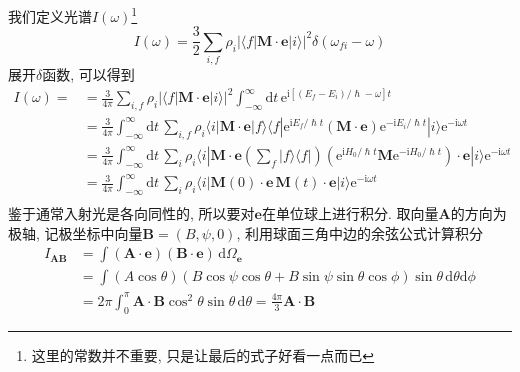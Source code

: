     我们定义光谱$I(\omega)$\footnote{这里的常数并不重要, 只是让最后的式子好看一点而已}
    \begin{equation}\label{eq:5-1}
        I(\omega) = \frac{3}{2} \sum_{i,f} \rho_i \left| \langle f|\bm{M} \cdot \bm{e}|i \rangle \right|^2 \delta(\omega_{fi} - \omega)
    \end{equation}
    展开$\delta$函数, 可以得到
    \begin{equation}\begin{aligned}
        I(\omega) = 
        &= \frac{3}{4\pi} \sum_{i,f} \rho_i \left| \langle f|\bm{M} \cdot \bm{e}|i \rangle \right|^2 \int_{-\infty}^{\infty} \mathrm{d}t\, \mathrm{e}^{\mathrm{i}\left[(E_f - E_i)/\hslash - \omega\right]t} \\
        &= \frac{3}{4\pi} \int_{-\infty}^{\infty} \mathrm{d}t\, \sum_{i,f} \rho_i \langle i|\bm{M} \cdot \bm{e}|f \rangle \langle f| \mathrm{e}^{\mathrm{i}E_f/\hslash t} \left(\bm{M} \cdot \bm{e}\right) \mathrm{e}^{-\mathrm{i}E_i/\hslash t} |i \rangle \mathrm{e}^{-\mathrm{i} \omega t} \\
        &= \frac{3}{4\pi} \int_{-\infty}^{\infty} \mathrm{d}t\, \sum_{i} \rho_i \langle i|\bm{M} \cdot \bm{e} \left(\sum_{f} |f \rangle \langle f| \right) \left( \mathrm{e}^{\mathrm{i}H_0/\hslash t} \bm{M} \mathrm{e}^{-\mathrm{i}H_0/\hslash t} \right) \cdot \bm{e}  |i \rangle \mathrm{e}^{-\mathrm{i} \omega t} \\
        &= \frac{3}{4\pi} \int_{-\infty}^{\infty} \mathrm{d}t\, \sum_{i} \rho_i \langle i|\bm{M}(0) \cdot \bm{e} \, \bm{M}(t) \cdot \bm{e} |i \rangle \mathrm{e}^{-\mathrm{i} \omega t} \\
    \end{aligned}\end{equation}
    鉴于通常入射光是各向同性的, 所以要对$\bm{e}$在单位球上进行积分. 取向量$\bm{A}$的方向为极轴, 记极坐标中向量$\bm{B} = (B, \psi, 0)$, 利用球面三角中边的余弦公式计算积分
    \begin{equation}\begin{aligned}
        I_{\bm{AB}} 
        &= \int (\bm{A} \cdot \bm{e})(\bm{B} \cdot \bm{e}) \,\mathrm{d} \Omega_{\bm e}\\
        &= \int (A\cos\theta)(B\cos\psi\cos\theta + B\sin\psi\sin\theta\cos\phi ) \sin\theta \,\mathrm{d}\theta \mathrm{d}\phi\\
        &= 2\pi \int_0^{\pi}\bm{A}\cdot\bm{B}\cos^2\theta\sin\theta\,\mathrm{d}\theta
         = \frac{4\pi}{3}\bm{A}\cdot\bm{B}
    \end{aligned}\end{equation}
